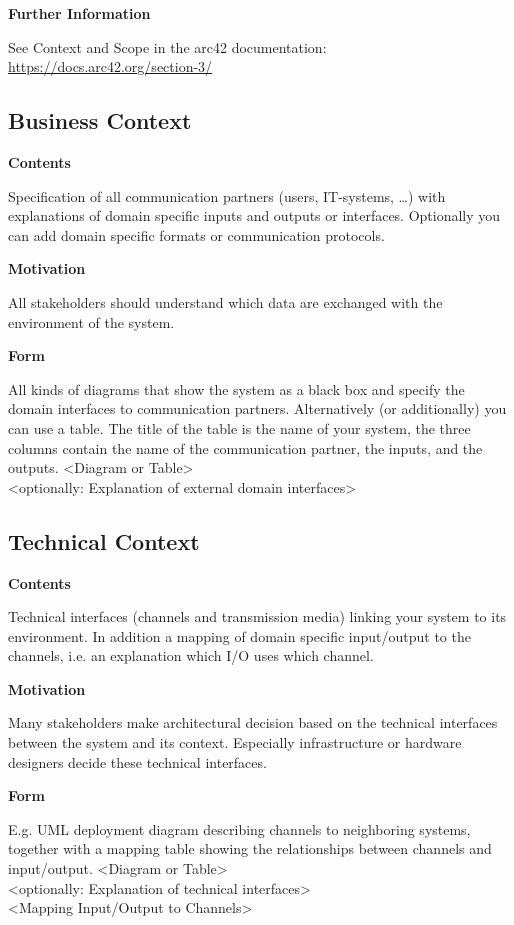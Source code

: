 \documentclass[12pt,a4paper]{article}
\newcommand{\minititle}[1]{%
  \par\addvspace{0.6\baselineskip}%
  \noindent\textbf{#1}\par\nobreak%
  \noindent\ignorespaces%
}
\begin{document}
\minititle{Further Information}
See Context and Scope in the arc42 documentation:
\href{https://docs.arc42.org/section-3/}{https://docs.arc42.org/section-3/}

\subsection{Business Context}

\minititle{Contents}
Specification of all communication partners (users, IT-systems, \dots) with explanations of domain specific inputs and outputs or interfaces. Optionally you can add domain specific formats or communication protocols.

\minititle{Motivation}
All stakeholders should understand which data are exchanged with the environment of the system.

\minititle{Form}
All kinds of diagrams that show the system as a black box and specify the domain interfaces to communication partners.
Alternatively (or additionally) you can use a table. The title of the table is the name of your system, the three columns contain the name of the communication partner, the inputs, and the outputs.
\textless Diagram or Table\textgreater\\
\textless optionally: Explanation of external domain interfaces\textgreater

\subsection{Technical Context}

\minititle{Contents}
Technical interfaces (channels and transmission media) linking your system to its environment. In addition a mapping of domain specific input/output to the channels, i.e. an explanation which I/O uses which channel.

\minititle{Motivation}
Many stakeholders make architectural decision based on the technical interfaces between the system and its context. Especially infrastructure or hardware designers decide these technical interfaces.

\minititle{Form}
E.g. UML deployment diagram describing channels to neighboring systems, together with a mapping table showing the relationships between channels and input/output.
\textless Diagram or Table\textgreater\\
\textless optionally: Explanation of technical interfaces\textgreater\\
\textless Mapping Input/Output to Channels\textgreater
\end{document}

